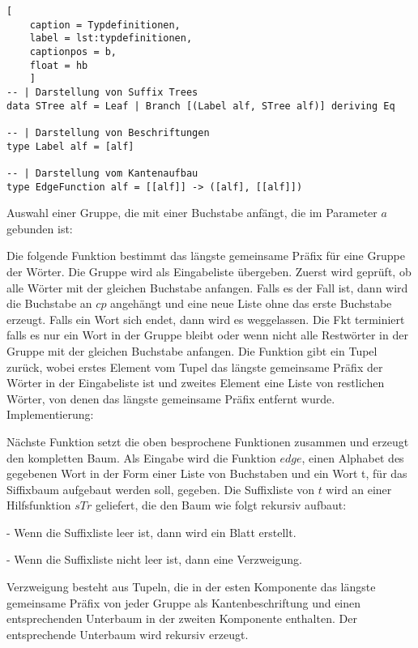 \documentclass[12pt]{report}
\begin{document}
\begin{lstlisting}[
    caption = Typdefinitionen,
    label = lst:typdefinitionen,
    captionpos = b,
    float = hb
    ]
-- | Darstellung von Suffix Trees
data STree alf = Leaf | Branch [(Label alf, STree alf)] deriving Eq

-- | Darstellung von Beschriftungen
type Label alf = [alf]

-- | Darstellung vom Kantenaufbau
type EdgeFunction alf = [[alf]] -> ([alf], [[alf]])
\end{lstlisting}

Auswahl einer Gruppe, die mit einer Buchstabe anfängt, die im Parameter $a$ gebunden ist:

Die folgende Funktion bestimmt das längste gemeinsame Präfix für eine Gruppe der Wörter. Die Gruppe wird als Eingabeliste übergeben. Zuerst wird geprüft, ob alle Wörter mit der gleichen Buchstabe anfangen. Falls es der Fall ist, dann wird die Buchstabe an $cp$ angehängt und eine neue Liste ohne das erste Buchstabe erzeugt. Falls ein Wort sich endet, dann wird es weggelassen. Die Fkt terminiert falls es nur ein Wort in der Gruppe bleibt oder wenn nicht alle Restwörter in der Gruppe mit der gleichen Buchstabe anfangen. Die Funktion gibt ein Tupel zurück, wobei erstes Element vom Tupel das längste gemeinsame Präfix der Wörter in der Eingabeliste ist und zweites Element eine Liste von restlichen Wörter, von denen das längste gemeinsame Präfix entfernt wurde. Implementierung:

Nächste Funktion setzt die oben besprochene Funktionen zusammen und erzeugt den kompletten Baum. Als Eingabe wird die Funktion $edge$, einen Alphabet des gegebenen Wort in der Form einer Liste von Buchstaben und ein Wort t, für das Siffixbaum aufgebaut werden soll, gegeben. Die Suffixliste von $t$ wird an einer Hilfsfunktion $sTr$ geliefert, die den Baum wie folgt rekursiv aufbaut:

    - Wenn die Suffixliste leer ist, dann wird ein Blatt erstellt.

    - Wenn die Suffixliste nicht leer ist, dann eine Verzweigung.

Verzweigung besteht aus Tupeln, die in der esten Komponente das längste gemeinsame Präfix von jeder Gruppe als Kantenbeschriftung und einen entsprechenden Unterbaum in der zweiten Komponente enthalten. Der entsprechende Unterbaum wird rekursiv erzeugt.
\end{document}
